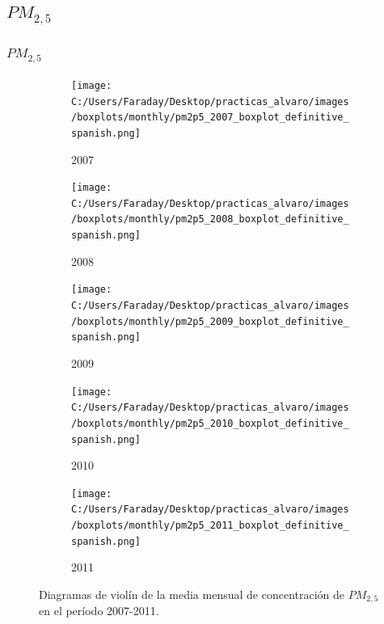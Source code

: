 \documentclass[12pt]{beamer}
\begin{document}
\subsection{$PM_{2,5}$}
\begin{frame}[squeeze]
\frametitle{$PM_{2,5}$}
\begin{figure}[H]
\centering
\begin{subfigure}[H]{0.32\textwidth}
\texttt{[image: C:/Users/Faraday/Desktop/practicas\_alvaro/images/boxplots/monthly/pm2p5\_2007\_boxplot\_definitive\_spanish.png]}
\captionsetup{labelformat=empty}
\caption{\scriptsize 2007}
\label{fig:box-pm2p5-2007}
\end{subfigure}
%
\begin{subfigure}[H]{0.32\textwidth}
\texttt{[image: C:/Users/Faraday/Desktop/practicas\_alvaro/images/boxplots/monthly/pm2p5\_2008\_boxplot\_definitive\_spanish.png]}
\captionsetup{labelformat=empty}
\caption{\scriptsize 2008}
\label{fig:box-pm2p5-2008}
\end{subfigure}
%
\begin{subfigure}[H]{0.32\textwidth}
\texttt{[image: C:/Users/Faraday/Desktop/practicas\_alvaro/images/boxplots/monthly/pm2p5\_2009\_boxplot\_definitive\_spanish.png]}
\captionsetup{labelformat=empty}
\caption{\scriptsize 2009}
\label{fig:box-pm2p5-2009}
\end{subfigure}

\begin{subfigure}[H]{0.32\textwidth}
\texttt{[image: C:/Users/Faraday/Desktop/practicas\_alvaro/images/boxplots/monthly/pm2p5\_2010\_boxplot\_definitive\_spanish.png]}
\captionsetup{labelformat=empty}
\caption{\scriptsize 2010}
\label{fig:box-pm2p5-2010}
\end{subfigure}
%
\begin{subfigure}[H]{0.32\textwidth}
\texttt{[image: C:/Users/Faraday/Desktop/practicas\_alvaro/images/boxplots/monthly/pm2p5\_2011\_boxplot\_definitive\_spanish.png]}
\captionsetup{labelformat=empty}
\caption{\scriptsize 2011}
\label{fig:box-pm2p5-2011}
\end{subfigure}
\caption{\scriptsize Diagramas de violín de la media mensual de concentración de $PM_{2,5}$ en el período 2007-2011.}
\label{fig:box-pm2p5-monthly}
\end{figure}
\end{frame}
\end{document}
